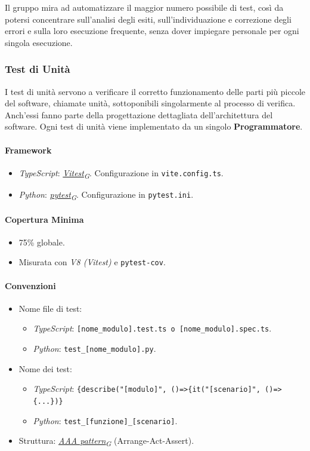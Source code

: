 \documentclass[12pt, a4paper]{article}
\newcommand{\urlglossario}{https://skynetunigroup.github.io/Code_Guardian/Documentazione/PB/glossario_v2.0.0.pdf} %
\newcommand{\glo}[2]{\href{\urlglossario\#nameddest=#2}{#1\textsubscript{G}}}
\begin{document}
Il gruppo mira ad automatizzare il maggior numero possibile di test, così da potersi concentrare sull'analisi degli esiti, sull'individuazione e correzione degli errori e sulla loro esecuzione frequente, senza dover impiegare personale per ogni singola esecuzione.

\subsubsection{Test di Unità}

I test di unità servono a verificare il corretto funzionamento delle parti più piccole del software, chiamate unità, sottoponibili singolarmente al processo di verifica. Anch'essi fanno parte della progettazione dettagliata dell'architettura del software. Ogni test di unità viene implementato da un singolo \textbf{Programmatore}.

\paragraph{Framework}
\begin{itemize}
    \item \textit{TypeScript}: \textit{\glo{Vitest}{vitest}}. Configurazione in \texttt{vite.config.ts}.
    \item \textit{Python}: \textit{\glo{pytest}{pytest}}. Configurazione in \texttt{pytest.ini}.
\end{itemize}

\paragraph{Copertura Minima}
\begin{itemize}
    \item 75\% globale.
    \item Misurata con \textit{V8 (Vitest)} e \texttt{pytest-cov}.
\end{itemize}

\paragraph{Convenzioni}
\begin{itemize}
    \item Nome file di test:
    \begin{itemize}
        \item \textit{TypeScript}: \texttt{[nome\_modulo].test.ts o [nome\_modulo].spec.ts}.
        \item \textit{Python}: \texttt{test\_[nome\_modulo].py}.
    \end{itemize}
    \item Nome dei test:
    \begin{itemize}
        \item \textit{TypeScript}: \verb+{describe("[modulo]", ()=>{it("[scenario]", ()=>{...})}+
        \item \textit{Python}: \texttt{test\_[funzione]\_[scenario]}.
    \end{itemize}
    \item Struttura: \textit{\glo{AAA pattern}{aaa-pattern}} (Arrange-Act-Assert).
\end{itemize}
\end{document}
